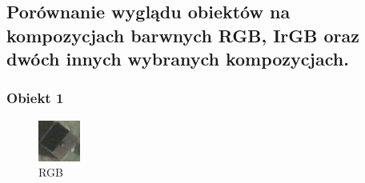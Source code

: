 \documentclass[a4paper,12pt]{article}  %
\begin{document}
\subsection{Porównanie wyglądu obiektów na kompozycjach barwnych RGB, IrGB oraz dwóch innych wybranych kompozycjach.}

\subsubsection{Obiekt 1}
\begin{figure}[H]
    \centering
    \begin{minipage}{0.24\textwidth}
        \centering
        \includegraphics[width=\linewidth]{spektralne/rgb_budynek7.png}
        \caption*{RGB}
    \end{minipage}
    \begin{minipage}{0.24\textwidth}
        \centering

\end{minipage}
\end{figure}
\end{document}
